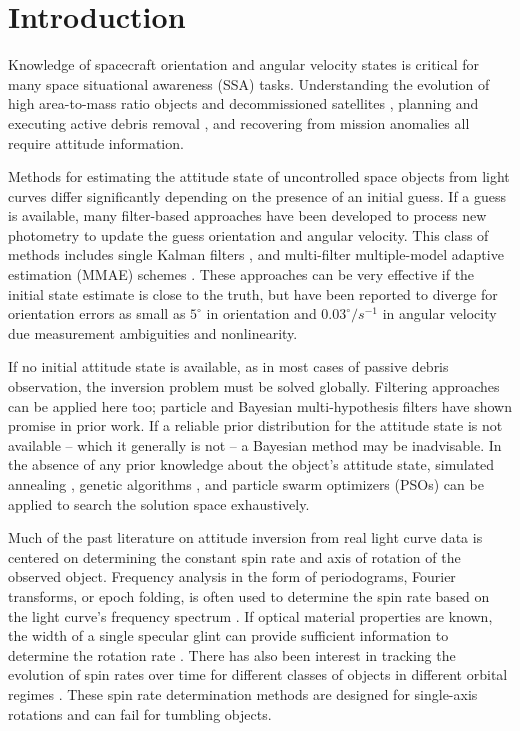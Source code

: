 \documentclass[a4paper,twocolumn]{spaceDebrisC} %
\begin{document}
\section{Introduction}

Knowledge of spacecraft orientation and angular velocity states is critical for many space situational awareness (SSA) tasks. Understanding the evolution of high area-to-mass ratio objects \cite{frueh2014} and decommissioned satellites \cite{rachman2023}, planning and executing active debris removal \cite{bonnal2013}, and recovering from mission anomalies \cite{umansky2023} all require attitude information. 

Methods for estimating the attitude state of uncontrolled space objects from light curves differ significantly depending on the presence of an initial guess. If a guess is available, many filter-based approaches have been developed to process new photometry to update the guess orientation and angular velocity. This class of methods includes single Kalman filters \cite{burton2021two, gagnon2024, wetterer2009}, and multi-filter multiple-model adaptive estimation (MMAE) schemes \cite{linares2014space, dianetti2020}. These approaches can be very effective if the initial state estimate is close to the truth, but have been reported to diverge for orientation errors as small as $5^\circ$ in orientation and $0.03^\circ/s^{-1}$ in angular velocity \cite{gagnon2024} due measurement ambiguities and nonlinearity.

If no initial attitude state is available, as in most cases of passive debris observation, the inversion problem must be solved globally. Filtering approaches can be applied here too; particle \cite{linares2014particle, holzinger2014} and Bayesian multi-hypothesis filters \cite{burton2021two, cabrera2023} have shown promise in prior work. If a reliable prior distribution for the attitude state is not available -- which it generally is not -- a Bayesian method may be inadvisable. In the absence of any prior knowledge about the object's attitude state, simulated annealing \cite{gagnon2024, clark2020}, genetic algorithms \cite{gagnon2024, piergentili2017, clark2020}, and particle swarm optimizers (PSOs) \cite{clark2020, clark2022, burton2024journal, burton2024scitech, gagnon2024} can be applied to search the solution space exhaustively.

Much of the past literature on attitude inversion from real light curve data is centered on determining the constant spin rate and axis of rotation of the observed object. Frequency analysis in the form of periodograms, Fourier transforms, or epoch folding, is often used to determine the spin rate based on the light curve's frequency spectrum \cite{silha2015, silha2021, isoletta2024, schildknecht2015, pittet2017, yanagisawa2012, koshkin2018}. If optical material properties are known, the width of a single specular glint can provide sufficient information to determine the rotation rate \cite{hinks2016}. There has also been interest in tracking the evolution of spin rates over time for different classes of objects in different orbital regimes \cite{koshkin2018, blacketer2022, karpov2016}. These spin rate determination methods are designed for single-axis rotations and can fail for tumbling objects.
\end{document}
